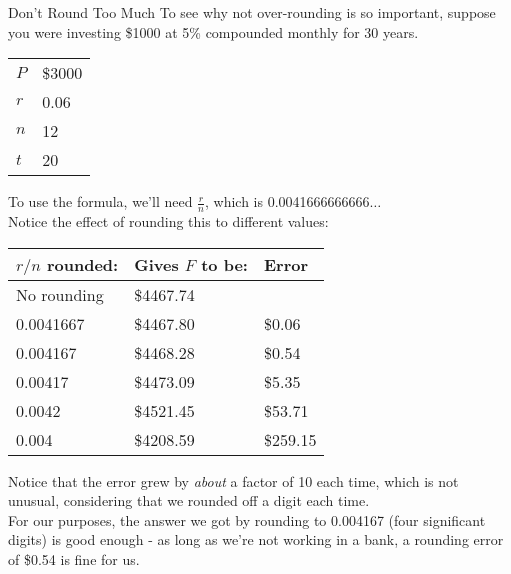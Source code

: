 \begin{example}[https://www.youtube.com/watch?v=o_iz3lt-GiU&list=PLfmpjsIzhztsZtnb7HnXrQ8SLoiOCIcAM&index=18]{Don't Round Too Much}
To see why not over-rounding is so important, suppose you were investing \$1000 at 5\% compounded monthly for 30 years.
\begin{center}
\begin{tabular}{l l}
$P$ & \$3000\\
$r$ & 0.06\\
$n$ & 12\\
$t$ & 20
\end{tabular}
\end{center}
To use the formula, we'll need $\frac{r}{n}$, which is 0.0041666666666$\ldots$\\

Notice the effect of rounding this to different values:
\begin{center}
\begin{tabular}{l l l}
$r/n$ rounded: & Gives $F$ to be: & Error\\
\hline
No rounding & \$4467.74 & \\
0.0041667 & \$4467.80 & \$0.06\\
0.004167 & \$4468.28 & \$0.54\\
0.00417 & \$4473.09 & \$5.35\\
0.0042 & \$4521.45 & \$53.71\\
0.004 & \$4208.59 & \$259.15
\end{tabular}
\end{center}
Notice that the error grew by \textit{about} a factor of 10 each time, which is not unusual, considering that we rounded off a digit each time. \\

For our purposes, the answer we got by rounding to 0.004167 (four significant digits) is good enough - as long as we're not working in a bank, a rounding error of \$0.54 is fine for us.
\end{example}
\vfill
\text{}
\vfill
\pagebreak

